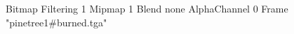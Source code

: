 {Bitmap
	{Filtering 1}
	{Mipmap 1}
	{Blend none}
	{AlphaChannel 0}
	{Frame "pinetree1#burned.tga"}
}
